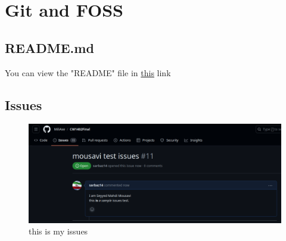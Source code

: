 \documentclass[12pt]{article}
\begin{document}
\section{Git and FOSS}
\subsection{README.md}
You can view the "README" file in \href{https://github.com/sarbaz14/latex/blob/master/README.md}{this} link

\subsection{Issues}
\begin{figure}[!h]
    \centering
    \includegraphics[width=1\textwidth]{issues.png}
    \caption{this is my issues}
\end{figure}
\end{document}
